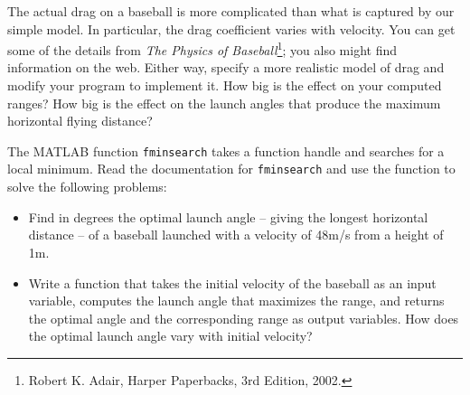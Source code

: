 \documentclass[
]{book}
\numberwithin{Answer}{chapter}
\numberwithin{Exercise}{chapter}
\begin{document}
\begin{ex}
	The actual drag on a baseball is more complicated than what is
captured by our simple model.  In particular, the drag coefficient
varies with velocity.  You can get some of the details from {\em The
Physics of Baseball}\footnote{Robert K. Adair, Harper Paperbacks, 3rd
Edition, 2002.}; you also might find information on the web.
Either way, specify a more realistic model of drag and modify your
program to implement it.  How big is the effect on your computed
ranges?  How big is the effect on the launch angles that produce the
maximum horizontal flying distance?
\end{ex}

\begin{ex}
The MATLAB function {\tt fminsearch} takes a function handle
and searches for a local minimum.  Read the documentation for
{\tt fminsearch} and use the function to solve the following problems:

\begin{itemize}

\item Find in degrees the optimal launch angle -- giving the longest horizontal distance --
of a baseball launched with a velocity of 48m/s from a height of 1m.

\item Write a function that takes the initial velocity of the baseball
as an input variable, computes the launch angle that maximizes
the range, and returns the optimal angle and the corresponding range as output variables.
How does the optimal launch angle vary with initial velocity?

\end{itemize}
\end{ex}
\end{document}
